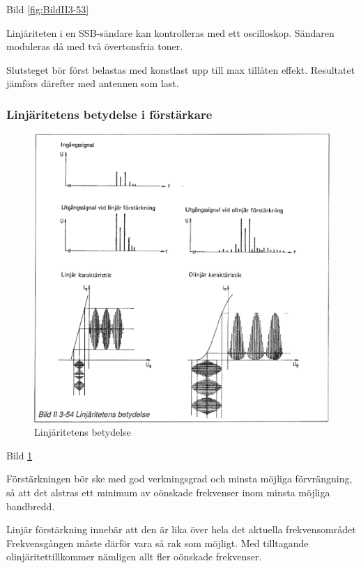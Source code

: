 Bild \ref{fig:BildII3-53}

Linjäriteten i en SSB-sändare kan kontrolleras med ett
oscilloskop. Sändaren moduleras då med två övertonsfria toner.

Slutsteget bör först belastas med konstlast upp till max tillåten
effekt. Resultatet jämförs därefter med antennen som last.

\subsubsection{Linjäritetens betydelse i förstärkare}

\begin{figure}
\includegraphics[width=\textwidth]{images/bild_2_3-54}
\caption{Linjäritetens betydelse}
\label{fig:BildII3-54}
\end{figure}

Bild \ref{fig:BildII3-54}

Förstärkningen bör ske med god verkningsgrad och minsta möjliga
förvrängning, så att det alstras ett minimum av oönskade frekvenser
inom minsta möjliga bandbredd.

Linjär förstärkning innebär att den är lika över hela det aktuella
frekvensområdet Frekvensgången måste därför vara så rak som
möjligt. Med tilltagande olinjäritettillkommer nämligen allt fler
oönskade frekvenser.


